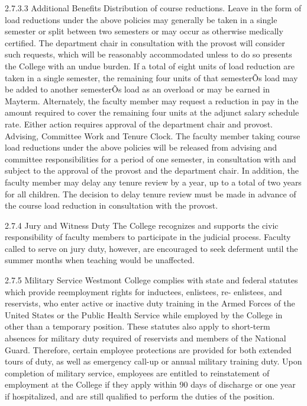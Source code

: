 \documentclass[letterpaper, 11pt]{article}
\begin{document}
2.7.3.3 Additional Benefits
   Distribution of course reductions. Leave in the form of load reductions under the above policies may generally be taken in a single semester or split between two semesters or may occur as otherwise medically certified. The department chair in consultation with the provost will consider such requests, which will be reasonably accommodated unless to do so presents the College with an undue burden. 
   If a total of eight units of load reduction are taken in a single semester, the remaining four units of that semesterÕs load may be added to another semesterÕs load as an overload or may be earned in Mayterm. Alternately, the faculty member may request a reduction in pay in the amount required to cover the remaining four units at the adjunct salary schedule rate. Either action requires approval of the department chair and provost.
   Advising, Committee Work and Tenure Clock.  The faculty member taking course load reductions under the above policies will be released from advising and committee responsibilities for a period of one semester, in consultation with and subject to the approval of the provost and the department chair. In addition, the faculty member may delay any tenure review by a year, up to a total of two years for all children.  The decision to delay tenure review must be made in advance of the course load reduction in consultation with the provost. 
   
2.7.4 Jury and Witness Duty
   The College recognizes and supports the civic responsibility of faculty members to participate in the judicial process.  Faculty called to serve on jury duty, however, are encouraged to seek deferment until the summer months when teaching would be unaffected.
   
2.7.5 Military Service
   Westmont College complies with state and federal statutes which provide reemployment rights for inductees, enlistees, re- enlistees, and reservists, who enter active or inactive duty training in the Armed Forces of the United States or the Public Health Service while employed by the College in other than a temporary position.  These statutes also apply to short-term absences for military duty required of reservists and members of the National Guard.  Therefore, certain employee protections are provided for both extended tours of duty, as well as emergency call-up or annual military training duty.  Upon completion of military service, employees are entitled to reinstatement of employment at the College if they apply within 90 days of discharge or one year if hospitalized, and are still qualified to perform the duties of the position.
   
\end{document}
